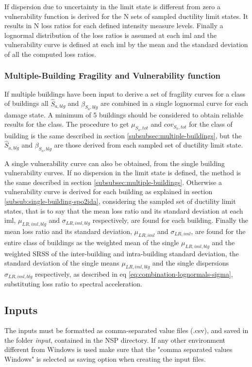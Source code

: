 If dispersion due to uncertainty in the limit state is different from zero a vulnerability function is derived for the N sets of sampled ductility limit states. It results in N loss ratios for each defined intensity measure levels. Finally a lognormal distribution of the loss ratios is assumed at each iml and the vulnerability curve is defined at each iml by the mean and the standard deviation of all the computed loss ratios.

\subsubsection{Multiple-Building Fragility and Vulnerability function}
\label{subsubsec:multiple-building-spo2ida}
If multiple buildings have been input to derive a set of fragility curves for a class of buildings all $\hat{S}_{a,blg}$ and $\beta_{S_a,blg}$ are combined in a single lognormal curve for each damage state. A minimum of 5 buildings should be considered to obtain reliable results for the class. The procedure to get $\mu_{S_a,tot}$ and $cov_{S_a,tot}$ for the class of building is the same described in section \ref{subsubsec:multiple-buildings}, but the $\hat{S}_{a,blg}$ and $\beta_{S_a,blg}$ are those derived from each sampled set of ductility limit state.

A single vulnerability curve can also be obtained, from the single building vulnerability curves. If no dispersion in the limit state is defined, the method is the same described in section \ref{subsubsec:multiple-buildings}. Otherwise a vulnerability curve is derived for each building as explained in section \ref{subsub:single-building-spo2ida}, considering the sampled set of ductility limit states, that is to say that the mean loss ratio and its standard deviation at each iml, $\mu_{LR,iml,blg}$ and $\sigma_{LR,iml,blg}$ respectively, are found for each building.
Finally the mean loss ratio and its standard deviation, $\mu_{LR,iml}$ and $\sigma_{LR,iml}$, are found for the entire class of buildings as the weighted mean of the single $\mu_{LR,iml,blg}$ and the weighted SRSS of the inter-building and intra-building standard deviation, the standard deviation of the single means $\mu_{LR,iml,blg}$ and the single dispersions $\sigma_{LR,iml,blg}$ respectively, as described in eq \ref{eq:combination-lognormals-sigma}, substituting loss ratio to spectral acceleration.

\subsection{Inputs}
\label{subsec:InputSpo2ida}
The inputs must be formatted as comma-separated value files (.csv), and saved in the folder \textit{input}, contained in the NSP directory. If any other environment different from Windows is used make sure that the "comma separated values Windows" is selected as saving option when creating the input files. 

